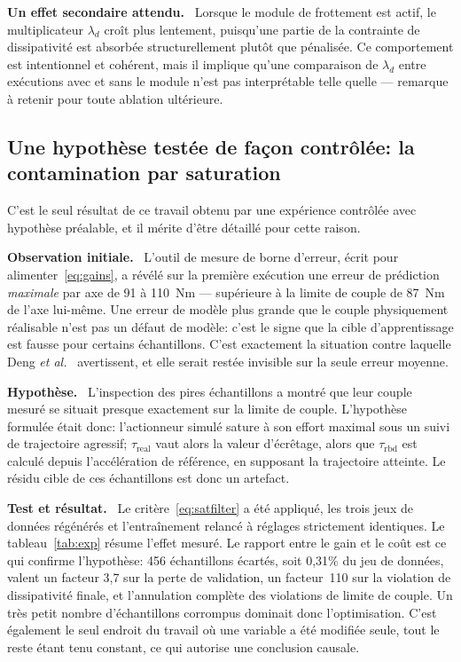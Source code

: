 \documentclass[a4paper, oneside]{article}
\newcommand{\parag}[1]{%
    \par\medskip\noindent\textbf{#1}\ \ignorespaces%
}
\newcommand{\taurbd}{\ensuremath{\tau_{\mathrm{rbd}}}}
\newcommand{\taureal}{\ensuremath{\tau_{\mathrm{real}}}}
\begin{document}
\parag{Un effet secondaire attendu.} Lorsque le module de frottement est
actif, le multiplicateur $\lambda_d$ croît plus lentement, puisqu'une partie de
la contrainte de dissipativité est absorbée structurellement plutôt que
pénalisée. Ce comportement est intentionnel et cohérent, mais il implique
qu'une comparaison de $\lambda_d$ entre exécutions avec et sans le module n'est
pas interprétable telle quelle — remarque à retenir pour toute ablation
ultérieure.

\subsection{Une hypothèse testée de façon contrôlée: la contamination par
saturation}
\label{sec:res-satfix}

C'est le seul résultat de ce travail obtenu par une expérience contrôlée avec
hypothèse préalable, et il mérite d'être détaillé pour cette raison.

\parag{Observation initiale.} L'outil de mesure de borne d'erreur, écrit pour
alimenter~\eqref{eq:gains}, a révélé sur la première exécution une erreur de
prédiction \emph{maximale} par axe de 91 à 110~Nm — supérieure à la limite de
couple de 87~Nm de l'axe lui-même. Une erreur de modèle plus grande que le
couple physiquement réalisable n'est pas un défaut de modèle: c'est le signe
que la cible d'apprentissage est fausse pour certains échantillons. C'est
exactement la situation contre laquelle Deng \emph{et al.}~\cite{deng2024}
avertissent, et elle serait restée invisible sur la seule erreur moyenne.

\parag{Hypothèse.} L'inspection des pires échantillons a montré que leur
couple mesuré se situait presque exactement sur la limite de couple.
L'hypothèse formulée était donc: l'actionneur simulé sature à son effort
maximal sous un suivi de trajectoire agressif; $\taureal$ vaut alors la valeur
d'écrêtage, alors que $\taurbd$ est calculé depuis l'accélération de référence,
en supposant la trajectoire atteinte. Le résidu cible de ces échantillons est
donc un artefact.

\parag{Test et résultat.} Le critère~\eqref{eq:satfilter} a été appliqué, les
trois jeux de données régénérés et l'entraînement relancé à réglages
strictement identiques. Le tableau~\ref{tab:exp} résume l'effet mesuré. Le
rapport entre le gain et le coût est ce qui confirme l'hypothèse: 456
échantillons écartés, soit 0{,}31\% du jeu de données, valent un facteur 3{,}7
sur la perte de validation, un facteur~110 sur la violation de dissipativité
finale, et l'annulation complète des violations de limite de couple. Un très
petit nombre d'échantillons corrompus dominait donc l'optimisation. C'est
également le seul endroit du travail où une variable a été modifiée seule, tout
le reste étant tenu constant, ce qui autorise une conclusion causale.
\end{document}
